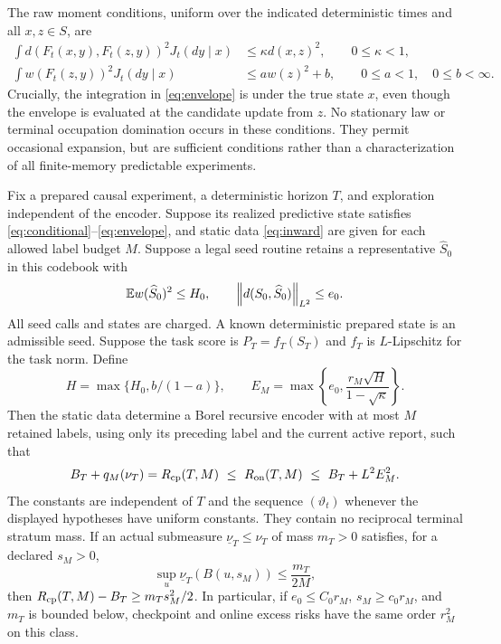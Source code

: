The raw moment conditions, uniform over the indicated deterministic times and all $x,z\in S$, are
\begin{align}
 \int d(F_t(x,y),F_t(z,y))^2 J_t(dy\mid x)
   &\le \kappa d(x,z)^2,\qquad 0\le\kappa<1,\label{eq:pair}\\
 \int w(F_t(z,y))^2 J_t(dy\mid x)
   &\le a w(z)^2+b,\qquad 0\le a<1,
       \quad 0\le b<\infty.\label{eq:envelope}
\end{align}
Crucially, the integration in \eqref{eq:envelope} is under the true state $x$, even though the envelope is evaluated at the candidate update from $z$. No stationary law or terminal occupation domination occurs in these conditions. They permit occasional expansion, but are sufficient conditions rather than a characterization of all finite-memory predictable experiments.

\begin{theorem}\label{thm:inward}
Fix a prepared causal experiment, a deterministic horizon $T$, and exploration independent of the encoder. Suppose its realized predictive state satisfies \eqref{eq:conditional}--\eqref{eq:envelope}, and static data \eqref{eq:inward} are given for each allowed label budget $M$. Suppose a legal seed routine retains a representative $\widehat S_0$ in this codebook with
\[
 \mathbb E w(\widehat S_0)^2\le H_0,
 \qquad \left\lVert d(S_0,\widehat S_0)\right\rVert_{L^2}\le e_0.
\]
All seed calls and states are charged. A known deterministic prepared state is an admissible seed. Suppose the task score is $P_T=f_T(S_T)$ and $f_T$ is $L$-Lipschitz for the task norm. Define
\begin{equation}\label{eq:radius}
 H=\max\{H_0,b/(1-a)\},\qquad
 E_M=\max\left\{e_0,\frac{r_M\sqrt H}{1-\sqrt\kappa}\right\}.
\end{equation}
Then the static data determine a Borel recursive encoder with at most $M$ retained labels, using only its preceding label and the current active report, such that
\begin{equation}\label{eq:main}
 B_T+q_M(\nu_T)=R_{\mathrm{cp}}(T,M)
 \ \le\ R_{\mathrm{on}}(T,M)
 \ \le\ B_T+L^2E_M^2.
\end{equation}
The constants are independent of $T$ and the sequence $(\vartheta_t)$ whenever the displayed hypotheses have uniform constants. They contain no reciprocal terminal stratum mass. If an actual submeasure $\underline\nu_T\le\nu_T$ of mass $m_T>0$ satisfies, for a declared $s_M>0$,
\begin{equation}\label{eq:sb-main}
 \sup_{u}\underline\nu_T(B(u,s_M))\le \frac{m_T}{2M},
\end{equation}
then $R_{\mathrm{cp}}(T,M)-B_T\ge m_T s_M^2/2$. In particular, if $e_0\le C_0r_M$, $s_M\ge c_0r_M$, and $m_T$ is bounded below, checkpoint and online excess risks have the same order $r_M^2$ on this class.
\end{theorem}

